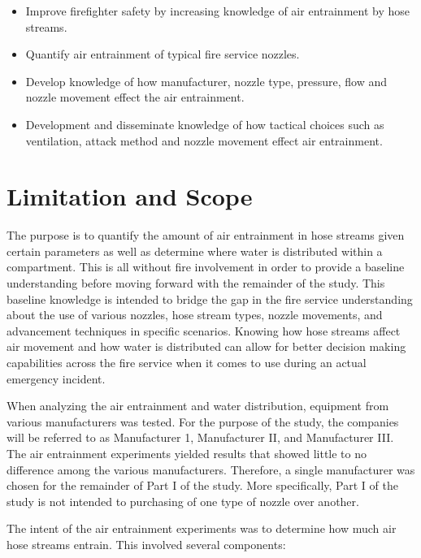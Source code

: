 \documentclass[12pt,oneside]{book}
\begin{document}
\begin{itemize}
	\item Improve firefighter safety by increasing knowledge of air entrainment by hose streams.
	\item Quantify air entrainment of typical fire service nozzles. 
	\item Develop knowledge of how manufacturer, nozzle type, pressure, flow and nozzle movement effect the air entrainment.
	\item Development and disseminate knowledge of how tactical choices such as ventilation, attack method and nozzle movement effect air entrainment. 
	\end{itemize}

\clearpage

\chapter{Limitation and Scope}

The purpose is to quantify the amount of air entrainment in hose streams given certain parameters as well as determine where water is distributed within a compartment. This is all without fire involvement in order to provide a baseline understanding before moving forward with the remainder of the study. This baseline knowledge is intended to bridge the gap in the fire service understanding about the use of various nozzles, hose stream types, nozzle movements, and advancement techniques in specific scenarios. Knowing how hose streams affect air movement and how water is distributed can allow for better decision making capabilities across the fire service when it comes to use during an actual emergency incident.

When analyzing the air entrainment and water distribution, equipment from various manufacturers was tested. For the purpose of the study, the companies will be referred to as Manufacturer 1, Manufacturer II, and Manufacturer III. The air entrainment experiments yielded results that showed little to no difference among the various manufacturers. Therefore, a single manufacturer was chosen for the remainder of Part I of the study. More specifically, Part I of the study is not intended to purchasing of one type of nozzle over another.

The intent of the air entrainment experiments was to determine how much air hose streams entrain. This involved several components:
\end{document}

